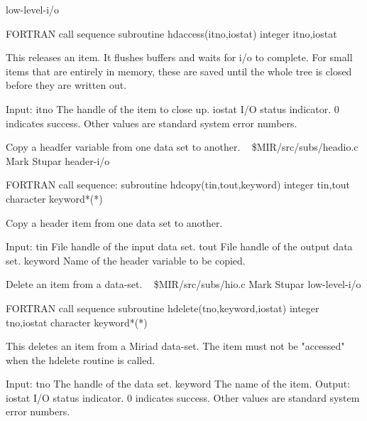 \newline {} low-level-i/o
\par{\tenpoint
{\eightpoint\begintt
FORTRAN call sequence
        subroutine hdaccess(itno,iostat)
        integer itno,iostat

  This releases an item. It flushes buffers and waits for i/o to complete.
  For small items that are entirely in memory, these are saved until
  the whole tree is closed before they are written out.

  Input:
    itno        The handle of the item to close up.
    iostat      I/O status indicator. 0 indicates success. Other values
                are standard system error numbers.                      
\endtt}
\par}
%
\noindent Copy a headfer variable from one data set to another.
\newline \ 
\newline {} \$MIR/src/subs/headio.c
\newline {} Mark Stupar
\newline {} header-i/o
\par{\tenpoint
{\eightpoint\begintt
FORTRAN call sequence:
        subroutine hdcopy(tin,tout,keyword)
        integer tin,tout
        character keyword*(*)

  Copy a header item from one data set to another.

  Input:
    tin         File handle of the input data set.
    tout        File handle of the output data set.
    keyword     Name of the header variable to be copied.               
\endtt}
\par}
%
\noindent Delete an item from a data-set.
\newline \ 
\newline {} \$MIR/src/subs/hio.c
\newline {} Mark Stupar
\newline \abox{Keywords:} low-level-i/o
\par{\tenpoint
{\eightpoint\begintt
FORTRAN call sequence
        subroutine hdelete(tno,keyword,iostat)
        integer tno,iostat
        character keyword*(*)

  This deletes an item from a Miriad data-set. The item must not be "accessed"
  when the hdelete routine is called.

  Input:
    tno         The handle of the data set.
    keyword     The name of the item.
  Output:
   iostat       I/O status indicator. 0 indicates success. Other values
                are standard system error numbers.                      
\endtt}
\par}
